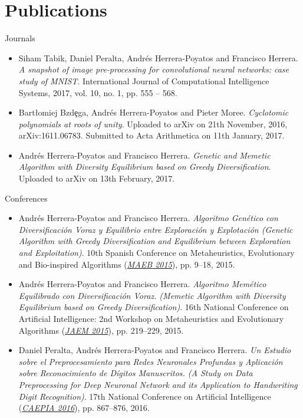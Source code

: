 \documentclass[10pt,a4paper,sans]{moderncv} %
\begin{document}
\section{Publications}

	{\large \textcolor{color1}{Journals}}

		\begin{itemize}
			\item Siham Tabik, Daniel Peralta, Andrés Herrera-Poyatos and Francisco Herrera. \textit{A snapshot of image pre-processing for convolutional neural networks: case study of MNIST}. International Journal of Computational Intelligence Systems, 2017, vol. 10, no. 1, pp. 555 -- 568.
			\item Bart{\l}omiej Bzd\c{e}ga, Andr\'es Herrera-Poyatos and Pieter Moree. \textit{Cyclotomic polynomials at roots of unity}. Uploaded to arXiv on 21th November, 2016, arXiv:1611.06783. Submitted to Acta Arithmetica on 11th January, 2017.
            \item Andr\'es Herrera-Poyatos and Francisco Herrera. \textit{Genetic and Memetic Algorithm with Diversity Equilibrium based on Greedy Diversification}. Uploaded to arXiv on 13th February, 2017.
		\end{itemize}

    {\large \textcolor{color1}{Conferences}}

		\begin{itemize}
			\item  Andrés Herrera-Poyatos and Francisco Herrera. \textit{Algoritmo Genético con Diversificación Voraz y Equilibrio entre Exploración y Explotación (Genetic Algorithm with Greedy Diversification and Equilibrium between Exploration and Exploitation)}. 10th Spanish Conference on Metaheuristics, Evolutionary and Bio-inspired Algorithms (\textcolor{color1}{\textit{\href{http://www.eweb.unex.es/eweb/maeb2015/}{MAEB 2015}}}), pp. 9--18, 2015.
			\item  Andrés Herrera-Poyatos and Francisco Herrera. \textit{Algoritmo Memético Equilibrado con Diversificación Voraz. (Memetic Algorithm with Diversity Equilibrium based on Greedy Diversification)}. 16th National Conference on Artificial Intelligence: 2nd Workshop on Metaheuristics and Evolutionary Algorithms (\textcolor{color1}{\textit{\href{http://simd.albacete.org/caepia15/conferencia/jaem2015/}{JAEM 2015}}}), pp. 219--229, 2015.
			\item Daniel Peralta, Andrés Herrera-Poyatos and Francisco Herrera. \textit{Un Estudio sobre el Preprocesamiento para Redes Neuronales Profundas y Aplicación sobre Reconocimiento de Dígitos Manuscritos. (A Study on Data Preprocessing for Deep Neuronal Network and its Application to Handwriting Digit Recognition)}. 17th National Conference on Artificial Intelligence (\textcolor{color1}{\textit{\href{http://www.congresocedi.es/es/caepia}{CAEPIA 2016}}}), pp. 867--876, 2016.
		\end{itemize}
\end{document}
